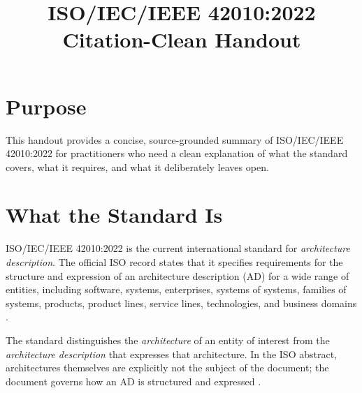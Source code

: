 \documentclass[11pt]{article}
\title{ISO/IEC/IEEE 42010:2022\\Citation-Clean Handout}
\author{}
\date{}
\begin{document}
\maketitle

\section*{Purpose}
This handout provides a concise, source-grounded summary of ISO/IEC/IEEE 42010:2022 for practitioners who need a clean explanation of what the standard covers, what it requires, and what it deliberately leaves open.

\section*{What the Standard Is}
ISO/IEC/IEEE 42010:2022 is the current international standard for \emph{architecture description}. The official ISO record states that it specifies requirements for the structure and expression of an architecture description (AD) for a wide range of entities, including software, systems, enterprises, systems of systems, families of systems, products, product lines, service lines, technologies, and business domains \cite{iso42010}.

The standard distinguishes the \emph{architecture} of an entity of interest from the \emph{architecture description} that expresses that architecture. In the ISO abstract, architectures themselves are explicitly not the subject of the document; the document governs how an AD is structured and expressed \cite{iso42010}.
\end{document}
